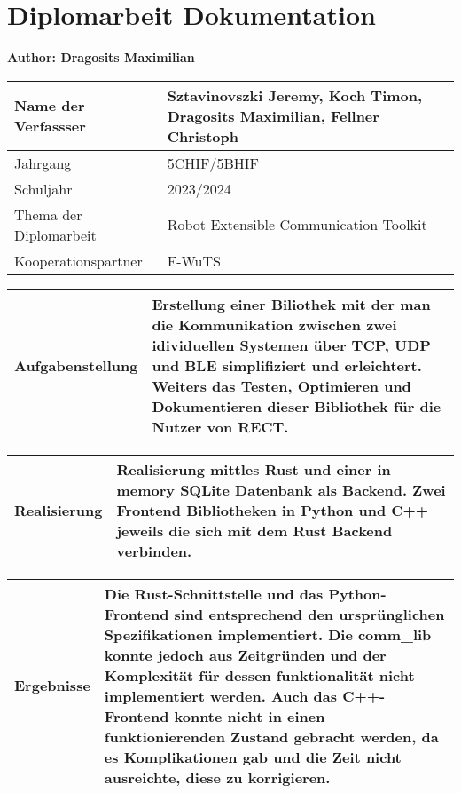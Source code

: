 \chapter{Diplomarbeit Dokumentation}
\textbf{Author: Dragosits Maximilian}

\begin{center}
\begin{tabular}{| m{8cm} | m{8cm} |}
    \hline
    Name der Verfassser & Sztavinovszki Jeremy, Koch Timon, Dragosits Maximilian, Fellner Christoph\\
    \hline
    Jahrgang & 5CHIF/5BHIF\\
    Schuljahr & 2023/2024\\
    \hline
    Thema der Diplomarbeit & Robot Extensible Communication Toolkit\\
    \hline
    Kooperationspartner & F-WuTS\\
    \hline
\end{tabular}

\vspace{5mm}

\begin{tabular}{| m{8cm} | m{8cm} |}
    \hline
    Aufgabenstellung & Erstellung einer Biliothek mit der man die Kommunikation zwischen zwei idividuellen Systemen über TCP, UDP und BLE simplifiziert und erleichtert. Weiters das Testen, Optimieren und Dokumentieren dieser Bibliothek für die Nutzer von RECT.\\ %
    \hline
\end{tabular}

\vspace{5mm}

\begin{tabular}{| m{8cm} | m{8cm} |}
    \hline
    Realisierung & Realisierung mittles Rust und einer in memory SQLite Datenbank als Backend. Zwei Frontend Bibliotheken in Python und C++ jeweils die sich mit dem Rust Backend verbinden.\\ %
    \hline
\end{tabular}

\vspace{5mm}

\begin{tabular}{| m{8cm} | m{8cm} |}
    \hline
    Ergebnisse & Die Rust-Schnittstelle und das Python-Frontend sind entsprechend den ursprünglichen Spezifikationen implementiert. Die comm\_lib konnte jedoch aus Zeitgründen und der Komplexität für dessen funktionalität nicht implementiert werden. Auch das C++-Frontend konnte nicht in einen funktionierenden Zustand gebracht werden, da es Komplikationen gab und die Zeit nicht ausreichte, diese zu korrigieren.\\ %
    \hline
\end{tabular}


\end{center}
